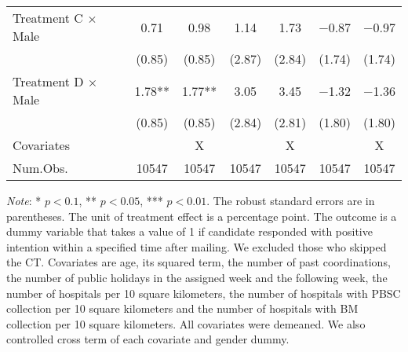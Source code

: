 \documentclass[12pt, a4paper]{article}
\begin{document}
\begin{table}[H]
\begin{threeparttable}
\begin{tabular}[t]{lcccccc}
Treatment C $\times$ Male & \num{0.71} & \num{0.98} & \num{1.14} & \num{1.73} & \num{-0.87} & \num{-0.97}\\
 & (\num{0.85}) & (\num{0.85}) & (\num{2.87}) & (\num{2.84}) & (\num{1.74}) & (\num{1.74})\\
Treatment D $\times$ Male & \num{1.78}** & \num{1.77}** & \num{3.05} & \num{3.45} & \num{-1.32} & \num{-1.36}\\
 & (\num{0.85}) & (\num{0.85}) & (\num{2.84}) & (\num{2.81}) & (\num{1.80}) & (\num{1.80})\\
\midrule
Covariates &  & X &  & X &  & X\\
Num.Obs. & \num{10547} & \num{10547} & \num{10547} & \num{10547} & \num{10547} & \num{10547}\\
\bottomrule
\end{tabular}
\begin{tablenotes}
\item \emph{Note}: * $p < 0.1$, ** $p < 0.05$, *** $p < 0.01$. The robust standard errors are in parentheses. The unit of treatment effect is a percentage point. The outcome is a dummy variable that takes a value of 1 if candidate responded with positive intention within a specified time after mailing. We excluded those who skipped the CT. Covariates are age, its squared term, the number of past coordinations, the number of public holidays in the assigned week and the following week, the number of hospitals per 10 square kilometers, the number of hospitals with PBSC collection per 10 square kilometers and the number of hospitals with BM collection per 10 square kilometers. All covariates were demeaned. We also controlled cross term of each covariate and gender dummy.
\end{tablenotes}
\end{threeparttable}
\end{table}
\end{document}
